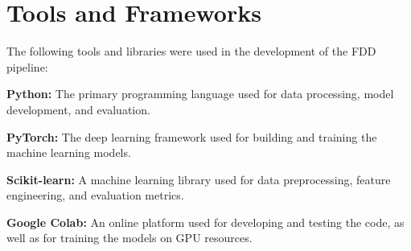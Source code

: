 \section{Tools and Frameworks}
The following tools and libraries were used in the development of the FDD pipeline:
\par\noindent\textbf{Python:} The primary programming language used for data processing, model development, and evaluation.

\par\noindent\textbf{PyTorch:} The deep learning framework used for building and training the machine learning models.

\par\noindent\textbf{Scikit-learn:} A machine learning library used for data preprocessing, feature engineering, and evaluation metrics.

\par\noindent\textbf{Google Colab:} An online platform used for developing and testing the code, as well as for training the models on GPU resources.

